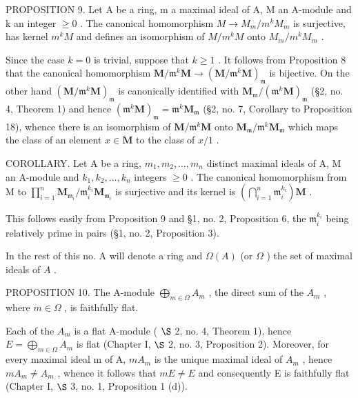 PROPOSITION 9. Let A be a ring, m a maximal ideal of A, M an A-module and k an integer \(\geqslant0\) . The canonical homomorphism \(M\to M_{m}/m^{k}M_{m}\) is surjective, has kernel \(m^{k}M\) and defines an isomorphism of \(M/m^{k}M\) onto \(M_{m}/m^{k}M_{m}\) .

Since the case \(k=0\) is trivial, suppose that \(k\geqslant1\) . It follows from Proposition 8 that the canonical homomorphism \(\mathbf{M}/\mathfrak{m}^{k}\mathbf{M}\to(\mathbf{M}/\mathfrak{m}^{k}\mathbf{M})_{\mathfrak{m}}\) is bijective. On the other hand \((\mathbf{M}/\mathfrak{m}^{k}\mathbf{M})_{\mathfrak{m}}\) is canonically identified with \(\mathbf{M}_{\mathfrak{m}}/(\mathfrak{m}^{k}\mathbf{M})_{\mathfrak{m}}\) (§2, no. 4, Theorem 1) and hence \((\mathfrak{m}^{k}\mathbf{M})_{\mathfrak{m}}=\mathfrak{m}^{k}\mathbf{M}_{\mathfrak{m}}\) (§2, no. 7, Corollary to Proposition 18), whence there is an isomorphism of \(\mathbf{M}/\mathfrak{m}^{k}\mathbf{M}\) onto \(\mathbf{M}_{\mathfrak{m}}/\mathfrak{m}^{k}\mathbf{M}_{\mathfrak{m}}\) which maps the class of an element \(x\in\mathbf{M}\) to the class of \(x/1\) .

COROLLARY. Let A be a ring, \(m_{1}, m_{2}, \ldots, m_{n}\) distinct maximal ideals of A, M an A-module and \(k_{1}, k_{2}, \ldots, k_{n}\) integers \(\geqslant 0\) . The canonical homomorphism from M to \(\prod_{i=1}^{n} \mathbf{M}_{\mathfrak{m}_{i}}/\mathfrak{m}_{i}^{k_{i}} \mathbf{M}_{\mathfrak{m}_{i}}\) is surjective and its kernel is \(\left(\bigcap_{i=1}^{n} \mathfrak{m}_{i}^{k_{i}}\right) \mathbf{M}\) .

This follows easily from Proposition 9 and §1, no. 2, Proposition 6, the \(\mathfrak{m}_{i}^{k_{i}}\) being relatively prime in pairs (§1, no. 2, Proposition 3).

In the rest of this no. A will denote a ring and \(\Omega(A)\) (or \(\Omega\) ) the set of maximal ideals of \(A\) .

PROPOSITION 10. The A-module \(\bigoplus_{m\in\Omega}A_m\) , the direct sum of the \(A_m\) , where \(m\in\Omega\) , is faithfully flat.

Each of the \(A_{m}\) is a flat A-module ( \(\S\) 2, no. 4, Theorem 1), hence \(E = \bigoplus_{m \in \Omega} A_{m}\) is flat (Chapter I, \(\S\) 2, no. 3, Proposition 2). Moreover, for every maximal ideal m of A, \(mA_{m}\) is the unique maximal ideal of \(A_{m}\) , hence \(mA_{m} \neq A_{m}\) , whence it follows that \(mE \neq E\) and consequently E is faithfully flat (Chapter I, \(\S\) 3, no. 1, Proposition 1 (d)).


